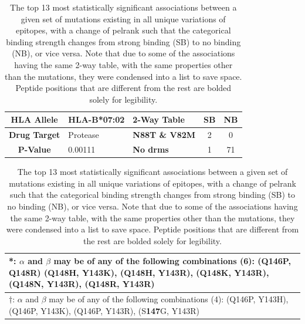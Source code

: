 \begin{table}[h]
    \begin{tabular}{||c|m{6em}||m{8em}|c|c||}
        \hline
        \textbf{HLA Allele}  & HLA-B*07:02 & \textbf{2-Way Table}  & \textbf{SB} & \textbf{NB} \\
        \hline
        \textbf{Drug Target} & Protease    & \textbf{N88T \& V82M} & 2           & 0           \\
        \hline
        \textbf{P-Value}     & 0.00111     & \textbf{No \acp{drm}} & 1           & 71          \\
        \hline
    \end{tabular}

    \medskip

    \begin{tabular}{||m{}||}
        \hline
        \textbf{*}: $\alpha$ and $\beta$ may be of any of the following combinations (6): (Q\textbf{146}P, Q\textbf{148}R) (Q148H, Y143K), (Q148H, Y143R), (Q148K, Y143R), (Q148N, Y143R), (Q148R, Y143R) \\
        \hline
        \hline
        $\dag$: $\alpha$ and $\beta$ may be of any of the following combinations (4): (Q146P, Y143H), (Q146P, Y143K), (Q146P, Y143R), (S\textbf{147}G, Y143R)                                             \\
        \hline
    \end{tabular}
    \caption{The top 13 most statistically significant associations between a given set of mutations existing in all unique variations of epitopes, with a change of \acl{pelrank} such that the categorical binding strength changes from strong binding (SB) to no binding (NB), or vice versa. Note that due to some of the associations having the same 2-way table, with the same properties other than the mutations, they were condensed into a list to save space. Peptide positions that are different from the rest are bolded solely for legibility.}
    \label{table:mutation_association_with_binding}
\end{table}